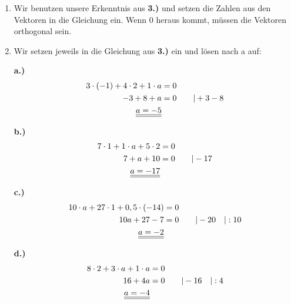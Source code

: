 \begin{enumerate}
		\item Wir benutzen unsere Erkenntnis aus \textbf{3.)} und setzen die Zahlen aus den Vektoren in die Gleichung ein. Wenn 0 heraus kommt, müssen die Vektoren orthogonal sein.
		
		
		\item
		Wir setzen jeweils in die Gleichung aus \textbf{3.)} ein und lösen nach a auf:
		\item[\textbf{a.)}] 
		\begin{align*}
			3\cdot(-1) + 4\cdot2 + 1\cdot a &= 0 \\
			-3 + 8 + a &= 0 	\qquad | +3 -8  \\
			\underline{\underline{a = -5}}							
		\end{align*}
		\item[\textbf{b.)}] 
		\begin{align*}
			7\cdot1+1\cdot a+5\cdot2&=0\\
			7+a+10&=0 			\qquad |-17\\
			\underline{\underline{a=-17}}& \\
		\end{align*}
		\item[\textbf{c.)}]
		\begin{align*}
				10\cdot a+27\cdot1+0,5\cdot(-14)&=0\\
			10a+27-7&=0 		\qquad |-20\quad |:10\\
			\underline{\underline{a=-2}}
		\end{align*}
	
	\item[\textbf{d.)}] 
		\begin{align*}
			8\cdot2+3\cdot a+1\cdot a &=0 \\
			16+4a &=0 			\qquad |-16 \quad |:4\\
			\underline{\underline{a=-4}}
		\end{align*}
	\end{enumerate}
	
